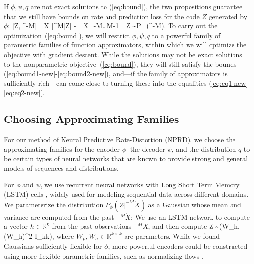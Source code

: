 \documentclass[entropy,article,submit,moreauthors,pdftex,10pt,a4paper]{Definitions/mdpi}
\newcommand{\finitefuture}{\overrightarrow{X}^{M}}
\newcommand{\finitepast}{^{-M}\overleftarrow{X}}%
\let\oldequation\equation
\let\oldendequation\endequation
\renewenvironment{equation}
  {\linenomathNonumbers\oldequation}
  {\oldendequation\endlinenomath}
\begin{document}
If $\phi, \psi, q$ are not exact solutions to (\ref{eq:bound}), the two propositions guarantee that we still have bounds on rate and prediction loss for the code $Z$ generated by $\phi$:
\begin{equation}\label{eq:bound1-new}
 [Z, \finitepast] \leq   {}_{X}\left[ \operatorname{D_{KL}}\infdivx{P_\phi(Z|\finitepast)}{q(Z)}\right]
\end{equation}
\begin{equation}\label{eq:bound2-new}
  [\finitefuture|Z] \leq   - _{X_{-M\dots M-1}}	_{Z \sim P_\phi(\finitepast)}\left[\log P_\psi(\finitefuture | Z)\right]. %
\end{equation}
To carry out the optimization~(\ref{eq:bound}), we will restrict $\phi, \psi, q$ to a powerful family of parametric families of function approximators, within which we will optimize the objective with gradient descent.
While the solutions may not be exact solutions to the nonparametric objective~(\ref{eq:bound}), they will still satisfy the bounds (\ref{eq:bound1-new}-\ref{eq:bound2-new}), and---if the family of approximators is sufficiently rich---can come close to turning these into the equalities (\ref{eq:eq1-new}-\ref{eq:eq2-new}).
 



\subsection{Choosing Approximating Families}
For our method of Neural Predictive Rate-Distortion (NPRD), we choose the approximating families for the encoder $\phi$, the decoder $\psi$, and the distribution $q$ to be certain types of neural networks that are known to provide strong and general models of sequences and distributions.

For $\phi$ and $\psi$, we use recurrent neural networks with Long Short Term Memory (LSTM) cells \citep{hochreiter-long-1997}, widely used for modeling sequential data across different domains.
We parameterize the distribution $P_\phi(Z|\finitepast)$ as a Gaussian whose mean and variance are computed from the past $\finitepast$:
We use an LSTM network to compute a vector $h \in \mathbb{R}^k$ from the past observations $\finitepast$, and then compute
\begin{equation}\label{eq:z-gauss}
	Z \sim {}(W_\mu h, (W_\sigma h)^2 I_{k\times k}),
\end{equation}
where $W_\mu, W_\sigma \in \mathbb{R}^{k\times k}$ are parameters.
While we found Gaussians sufficiently flexible for $\phi$, more powerful encoders could be constructed using more flexible parametric families, such as normalizing flows \citep{rezende-variational-2015, kingma-improving-2016}.
\end{document}
